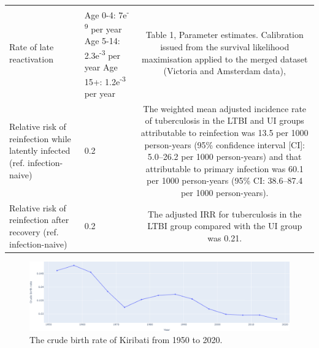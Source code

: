 \documentclass{article}
\begin{document}
\begin{table}[!htp]
\begin{tabularx}{\textwidth}{ X  X  c }
        Rate of late reactivation & 
        \begin{minipage}[t]{0.3\textwidth}
            Age 0-4: 7e\textsuperscript{-9} per year \newline
            Age 5-14: 2.3e\textsuperscript{-3} per year  \newline
            Age 15+: 1.2e\textsuperscript{-3} per year \newline
        \end{minipage}
        &
        \begin{minipage}[t]{0.4\textwidth}
        Table 1, Parameter estimates. Calibration issued from the survival likelihood maximisation applied 
        to the merged dataset (Victoria and Amsterdam data), \cite{ragonnet-2017}
        \end{minipage} \\
        Relative risk of reinfection while latently infected (ref. infection-naive) & 0.2 &
        \begin{minipage}[t]{0.4\textwidth}
        The weighted mean adjusted incidence rate of tuberculosis in the LTBI and UI 
        groups attributable to reinfection was 13.5 per 1000 person-years
        (95\% confidence interval [CI]: 5.0–26.2 per 1000 person-years) and that 
        attributable to primary infection was 60.1 per 1000 person-years 
        (95\% CI: 38.6–87.4 per 1000 person-years). \cite{andrews-2012}
        \end{minipage} \\
        Relative risk of reinfection after recovery (ref. infection-naive) & 0.2 & \begin{minipage}[t]{0.4\textwidth}
        The adjusted IRR for tuberculosis in the LTBI group compared with the UI group was 0.21. \cite{andrews-2012} 
        \end{minipage} \\
        \hline
	\end{tabularx}
\end{table}

\begin{figure}[!htp]
   \includegraphics[width=\textwidth,keepaspectratio]{images/cbr.png}
    \caption{The crude birth rate of Kiribati from 1950 to 2020.}
    \label{fig:cbr}
\end{figure}
\end{document}
